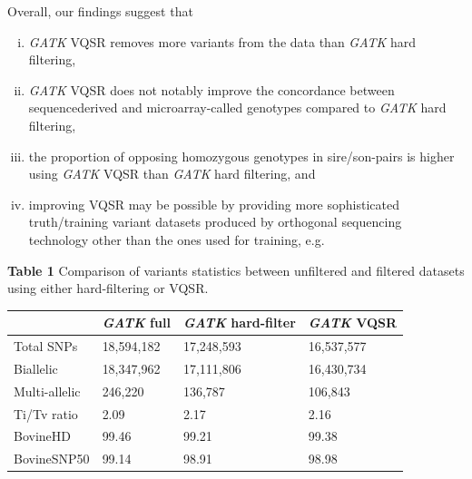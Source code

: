 \documentclass[../main.tex]{subfiles}
\begin{document}
\begin{flushleft}
Overall, our findings suggest that

\begin{enumerate}[(i)]
    \item \emph{GATK} VQSR removes more variants from the data than \emph{GATK} hard filtering,
    \item \emph{GATK} VQSR does not notably improve the concordance between sequencederived and microarray-called genotypes compared to \emph{GATK} hard filtering,
    \item the proportion of opposing homozygous genotypes in sire/son-pairs is higher using \emph{GATK} VQSR than \emph{GATK} hard filtering, and
    \item improving VQSR may be possible by providing more sophisticated truth/training variant datasets produced by orthogonal sequencing technology other than the ones used for training, e.g. \citep{li2018synthetic}
\end{enumerate}

\textbf{Table 1} Comparison of variants statistics between unfiltered and filtered datasets using
either hard-filtering or VQSR.


\bigskip

\begin{center}
\begin{tabular}{|l|l|l|l|} 
    \cline{2-4}
    \multicolumn{1}{l|}{~} & \textit{GATK} full & \textit{GATK }hard-filter & \textit{GATK} VQSR  \\ 
    \hline
    Total SNPs             & 18,594,182         & 17,248,593                & 16,537,577          \\ 
    \hline
    Biallelic              & 18,347,962         & 17,111,806                & 16,430,734          \\ 
    \hline
    Multi-allelic          & 246,220            & 136,787                   & 106,843             \\ 
    \hline
    Ti/Tv ratio            & 2.09               & 2.17                      & 2.16                \\ 
    \hline
    BovineHD               & 99.46              & 99.21                     & 99.38               \\ 
    \hline
    BovineSNP50            & 99.14              & 98.91                     & 98.98               \\
    \hline
    \end{tabular}
\end{center}


\end{flushleft}
\end{document}
